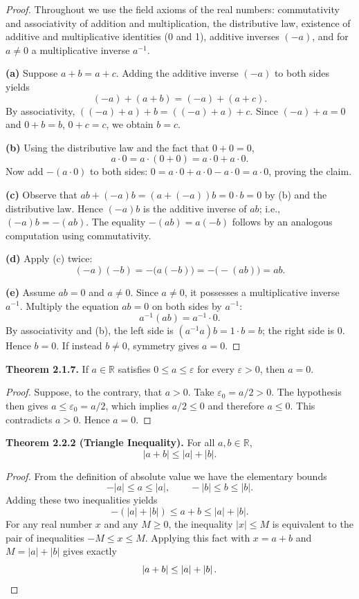 \documentclass[12pt,a4paper]{article}
\theoremstyle{definition}
\newcommand{\R}{\mathbb{R}}
\newcommand{\eps}{\varepsilon}
\newcommand{\abs}[1]{\left\lvert#1\right\rvert}
\begin{document}
\begin{proof}
Throughout we use the field axioms of the real numbers: commutativity and associativity of addition and multiplication, the distributive law, existence of additive and multiplicative identities (0 and 1), additive inverses \((-a)\), and for \(a\neq0\) a multiplicative inverse \(a^{-1}\).

\textbf{(a)} Suppose \(a+b=a+c\). Adding the additive inverse \((-a)\) to both sides yields
\[
(-a)+(a+b)=(-a)+(a+c).
\]
By associativity, \(((-a)+a)+b = ((-a)+a)+c\). Since \((-a)+a=0\) and \(0+b=b\), \(0+c=c\), we obtain \(b=c\).

\textbf{(b)} Using the distributive law and the fact that \(0+0=0\),
\[
a\cdot 0 = a\cdot(0+0)=a\cdot0 + a\cdot0.
\]
Now add \(-(a\cdot0)\) to both sides: \(0 = a\cdot0 + a\cdot0 - a\cdot0 = a\cdot0\), proving the claim.

\textbf{(c)} Observe that \(ab + (-a)b = (a+(-a))b = 0\cdot b = 0\) by (b) and the distributive law. Hence \((-a)b\) is the additive inverse of \(ab\); i.e., \((-a)b = -(ab)\). The equality \(-(ab)=a(-b)\) follows by an analogous computation using commutativity.

\textbf{(d)} Apply (c) twice:
\[
(-a)(-b) = -\bigl(a(-b)\bigr) = -\bigl(-(ab)\bigr) = ab.
\]

\textbf{(e)} Assume \(ab=0\) and \(a\neq0\). Since \(a\neq0\), it possesses a multiplicative inverse \(a^{-1}\). Multiply the equation \(ab=0\) on both sides by \(a^{-1}\):
\[
a^{-1}(ab) = a^{-1}\cdot0.
\]
By associativity and (b), the left side is \((a^{-1}a)b = 1\cdot b = b\); the right side is \(0\). Hence \(b=0\). If instead \(b\neq0\), symmetry gives \(a=0\).
\end{proof}

\textbf{Theorem 2.1.7.} If \(a\in\R\) satisfies \(0\le a\le\eps\) for every \(\eps>0\), then \(a=0\).

\begin{proof}
Suppose, to the contrary, that \(a>0\). Take \(\eps_0 = a/2 > 0\). The hypothesis then gives \(a\le\eps_0 = a/2\), which implies \(a/2\le0\) and therefore \(a\le0\). This contradicts \(a>0\). Hence \(a=0\).
\end{proof}

\textbf{Theorem 2.2.2 (Triangle Inequality).} For all \(a,b\in\R\),
\[
\abs{a+b}\le\abs{a}+\abs{b}.
\]

\begin{proof}
From the definition of absolute value we have the elementary bounds
\[
-\abs{a}\le a\le\abs{a},\qquad -\abs{b}\le b\le\abs{b}.
\]
Adding these two inequalities yields
\[
-(\abs{a}+\abs{b})\le a+b\le\abs{a}+\abs{b}.
\]
For any real number \(x\) and any \(M\ge0\), the inequality \(\abs{x}\le M\) is equivalent to the pair of inequalities \(-M\le x\le M\). Applying this fact with \(x=a+b\) and \(M=\abs{a}+\abs{b}\) gives exactly
\[
\abs{a+b}\le\abs{a}+\abs{b}. \qedhere
\]
\end{proof}
\end{document}
